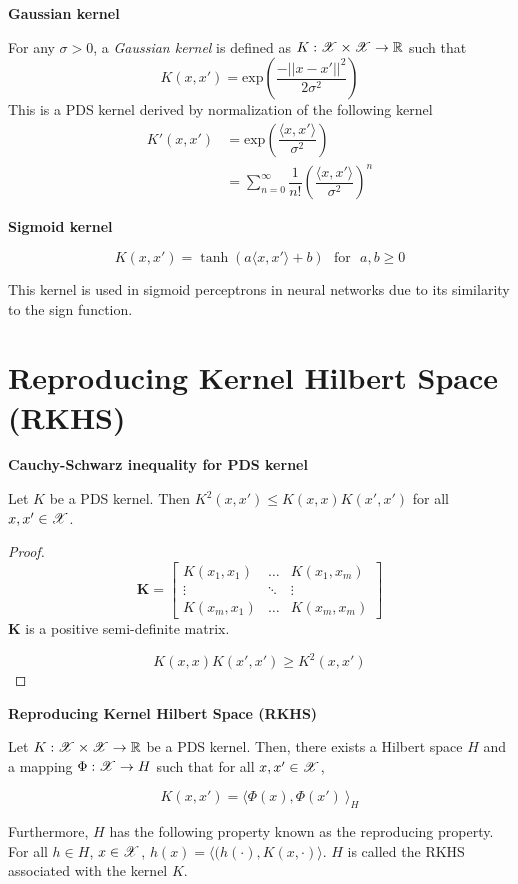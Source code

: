 \documentclass[a4paper,english,12pt]{article}
\begin{document}
\begin{exmp}
	\textbf{Gaussian kernel}

For any $\sigma > 0$, a \textit{Gaussian kernel} is defined as $K: \mathscr{X}\times\mathscr{X}\rightarrow\mathbb{R}$ such that
\[K(x,x') = \text{exp}\left(\dfrac{-||x-x'||^2}{2 \sigma^2}\right)\]
This is a PDS kernel derived by normalization of the following kernel
\begin{align*}
K'(x,x') &= \text{exp}\left(\dfrac{\langle x, x' \rangle}{\sigma^2}\right) \\
&= \sum_{n=0}^{\infty} \dfrac{1}{n!}\left(\dfrac{\langle x, x' \rangle}{\sigma^2}\right)^n
\end{align*}
\end{exmp}

\begin{exmp}
	\textbf{Sigmoid kernel}

\[K(x,x') = \tanh(a \langle x,x' \rangle + b) ~~~ \text{for} ~~~ a,b \ge 0\]

This kernel is used in sigmoid perceptrons in neural networks due to its similarity to the sign function.
\end{exmp}

\section{Reproducing Kernel Hilbert Space (RKHS)}

\begin{lem}
	\textbf{Cauchy-Schwarz inequality for PDS kernel}

Let $K$ be a PDS kernel. Then $K^2(x,x') \le K(x,x)K(x',x')$ for all $x, x' \in \mathscr{X}$.
\end{lem}

\begin{proof}
	\[\mathbf{K} =
	\begin{bmatrix}
	K(x_1,x_1) 	& \dots 	& K(x_1, x_m) \\
	\vdots		& \ddots 	& \vdots \\
	K(x_m, x_1) & \dots		& K(x_m, x_m)
	\end{bmatrix}
	\] $\mathbf{K}$ is a positive semi-definite matrix.
	
	\[K(x,x)K(x',x') \ge K^2(x,x')\]
\end{proof}

\begin{thm}
\textbf{Reproducing Kernel Hilbert Space (RKHS)}

Let $K: \mathscr{X} \times \mathscr{X} \rightarrow \mathbb{R}$ be a PDS kernel. Then, there exists a Hilbert space $H$ and a mapping $\Phi: \mathscr{X} \rightarrow H$ such that for all $x, x' \in \mathscr{X}$,

\[K(x,x') = \langle \Phi(x), \Phi(x')\ \rangle _H\]

Furthermore, $H$ has the following property known as the reproducing property. For all $h \in H$, $x \in \mathscr{X}$, $h(x) = \langle(h(\cdot),K(x, \cdot)\rangle$. $H$ is called the RKHS associated with the kernel $K$. 
\end{thm}
\end{document}
